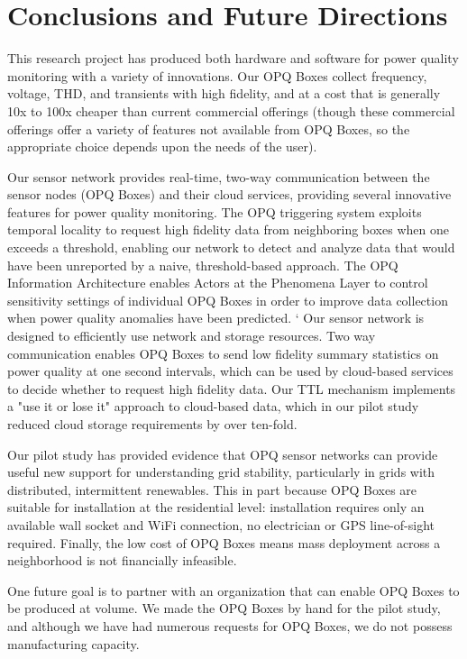\section{Conclusions and Future Directions}
\label{sec:conclusions}

This research project has produced both hardware and software for power quality monitoring with a variety of innovations.  Our OPQ Boxes collect frequency, voltage, THD, and transients with high fidelity, and at a cost that is generally 10x to 100x cheaper than current commercial offerings (though these commercial offerings offer a variety of features not available from OPQ Boxes, so the appropriate choice depends upon the needs of the user).

Our sensor network provides real-time, two-way communication between the sensor nodes (OPQ Boxes) and their cloud services, providing several innovative features for power quality monitoring. The OPQ triggering system exploits temporal locality to request high fidelity data from neighboring boxes when one exceeds a threshold, enabling our network to detect and analyze data that would have been unreported by a naive, threshold-based approach. The OPQ Information Architecture enables Actors at the Phenomena Layer to control sensitivity settings of individual OPQ Boxes in order to improve data collection when power quality anomalies have been predicted.
`
Our sensor network is designed to efficiently use network and storage resources. Two way communication enables OPQ Boxes to send low fidelity summary statistics on power quality at one second intervals, which can be used by cloud-based services to decide whether to request high fidelity data.  Our TTL mechanism implements a "use it or lose it" approach to cloud-based data, which in our pilot study reduced cloud storage requirements by over ten-fold.

Our pilot study has provided evidence that OPQ sensor networks can provide useful new support for understanding grid stability, particularly in grids with distributed, intermittent renewables. This in part because OPQ Boxes are suitable for installation at the residential level: installation requires only an available wall socket and WiFi connection, no electrician or GPS line-of-sight required. Finally, the low cost of OPQ Boxes means mass deployment across a neighborhood is not financially infeasible.

One future goal is to partner with an organization that can enable OPQ Boxes to be produced at volume. We made the OPQ Boxes by hand for the pilot study, and although we have had numerous requests for OPQ Boxes, we do not possess manufacturing capacity.

